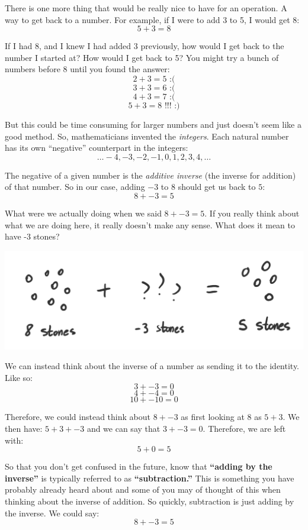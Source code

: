 \documentclass{article}
\begin{document}
There is one more thing that would be really nice to have for an operation. A way to get back to a number. For example, if I were to add 3 to 5, I would get 8: 
\[ 5 + 3 = 8 \]

If I had 8, and I knew I had added 3 previously, how would I get back to the number I started at? How would I get back to 5? You might try a bunch of numbers before 8 until you found the answer: 
\[ 2 + 3 = 5 \text{ :(} \]
\[ 3 + 3 = 6 \text{ :(} \]
\[ 4 + 3 = 7 \text{ :(} \]
\[ 5 + 3 = 8 \text{ !!! :)} \]

But this could be time consuming for larger numbers and just doesn't seem like a good method. So, mathematicians invented the \textit{integers}. Each natural number has its own ``negative'' counterpart in the integers: 
\[ \ldots -4, -3, -2, -1, 0, 1, 2, 3, 4, \ldots \]

The negative of a given number is the \textit{additive inverse} (the inverse for addition) of that number. So in our case, adding $-3$ to $8$ should get us back to $5$: 
\[ 8 + -3 = 5 \]

What were we actually doing when we said $8 + -3 = 5$. If you really think about what we are doing here, it really doesn't make any sense. What does it mean to have -3 stones? 
\begin{center}
    \includegraphics[scale=0.5]{chap1images/chapter1_draw3.png}
\end{center}

We can instead think about the inverse of a number as sending it to the identity. Like so: 
\[ 3 + -3 = 0 \]
\[ 4 + -4 = 0 \]
\[ 10 + -10 = 0 \]

Therefore, we could instead think about $8 + -3$ as first looking at 8 as $5+3$. We then have: $5 + 3 + -3$ and we can say that $3 + -3 = 0$. Therefore, we are left with: 
\[ 5 + 0 = 5 \]

So that you don't get confused in the future, know that \textbf{``adding by the inverse''} is typically referred to as \textbf{``subtraction.''} This is something you have probably already heard about and some of you may of thought of this when thinking about the inverse of addition. So quickly, subtraction is just adding by the inverse. We could say: 
\[ 8 + -3 = 5 \]
\end{document}
